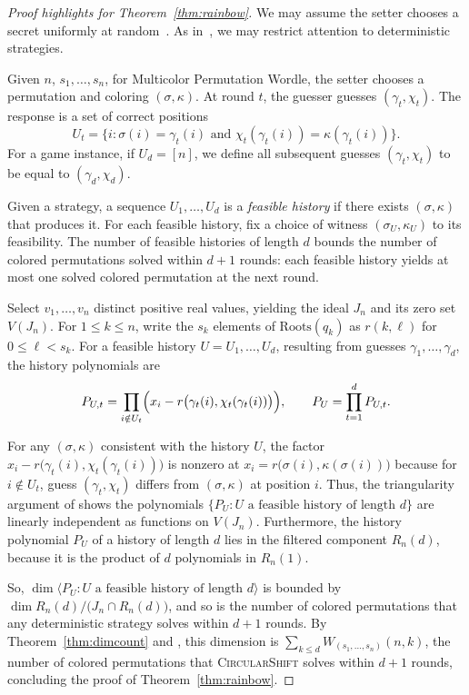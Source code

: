 \documentclass[12pt]{amsart}
\theoremstyle{definition}
\theoremstyle{remark}
\newcommand\rainbow{Multicolor Permutation Wordle\xspace}
\newcommand\basicstrat{\mbox{\textnormal{\textsc{CircularShift}}}\xspace}
\newcommand{\Roots}{\mathrm{Roots}}
\newcommand{\Dmult}[1]{{W_{(s_1, \ldots, s_{#1})}}}
\newcommand\KSV{monthly-kutin-smithline-vatter}
\begin{document}
\begin{proof}[Proof highlights for Theorem~\ref{thm:rainbow}]
We may assume the setter chooses a secret uniformly at random~\cite[\S2]{\KSV}.  As in~\cite[Theorem~11]{\KSV},
we may restrict attention to deterministic strategies.

Given $n$, $s_1, \ldots, s_n$,
for \rainbow, the setter chooses a permutation and coloring $(\sigma, \kappa)$.
At round $t$, the guesser guesses $(\gamma_t, \chi_t)$.  The response is a set of 
correct positions
\[U_t = \{ i: \sigma(i) = \gamma_t(i) \text{ and } \chi_t(\gamma_t(i)) = \kappa(\gamma_t(i))\}.
\]
For a game instance, if $U_d = [n]$, we define all subsequent guesses $(\gamma_t, \chi_t)$ to be
equal to $(\gamma_d, \chi_d)$.

Given a strategy, a sequence $U_1, \ldots, U_d$ is a \emph{feasible history}
if there exists $(\sigma, \kappa)$ that produces it.  For each feasible history, fix a choice
of witness $(\sigma_U, \kappa_U)$ to its feasibility.
The number of feasible histories of length $d$ bounds the number of 
colored permutations solved within $d+1$ rounds: each feasible history yields
at most one solved colored permutation at the next round.

Select $v_1, \ldots, v_n$ distinct positive real values, yielding the ideal $J_n$ and
its zero set $V(J_n)$.   For $1 \leq k \leq n$, write the 
$s_k$ elements of $\Roots(q_k)$
as $r(k, \ell)$ for $0 \leq \ell < s_k$.
For a feasible history $U = U_1, \ldots, U_d$, resulting from
guesses $\gamma_1, \ldots, \gamma_d$,
the history polynomials are
\[ P_{U, t} = \prod_{i \notin U_t} 
\Bigl( x_i - r\bigl(\gamma_t(i), \chi_t( \gamma_t (i) ) \bigr) \Bigr), \qquad
P_U = \prod_{t = 1}^d P_{U, t}.
\]

For any $(\sigma, \kappa)$ consistent with the history $U$, the factor $x_i - r\bigl(\gamma_t(i), \chi_t( \gamma_t (i))\bigr)$ is nonzero
at $x_i = r\bigl(\sigma(i), \kappa( \sigma(i))\bigr)$ because for $i \notin U_t$, 
guess $(\gamma_t, \chi_t)$
differs from $(\sigma, \kappa)$ at position $i$.
Thus, the triangularity
argument of \cite[Proposition~14]{\KSV} shows
the polynomials $\{P_U : U \text{ a feasible history of length } d \}$
are linearly independent as functions on $V(J_n)$.
Furthermore, the history polynomial $P_U$ of a history of length $d$ lies in the
filtered component $R_n(d)$, because it is the product of $d$ polynomials in $R_n(1)$.

So, $\dim \langle P_U : U \text{ a feasible history of length } d \rangle$ is bounded by
$\dim R_n(d) / \bigl(J_n \cap R_n(d) \bigr)$, and so is the number of colored
permutations that any deterministic strategy solves within $d+1$ rounds.
By Theorem~\ref{thm:dimcount}
and \cite[Def.~4.6 and Theorem~4.7]{arxiv-kutin-smithline}, this dimension is
$\sum_{k\le d} \Dmult{n}(n,k)$, the number of colored permutations that \basicstrat
solves within $d+1$ rounds,
concluding the proof of Theorem~\ref{thm:rainbow}.
\end{proof}
\end{document}
